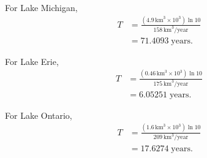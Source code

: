 \begin{ex}
\begin{enumerate}
\begin{sol}
          For Lake Michigan,
          \begin{align*}
            T&=\frac{\left(4.9\, \text{km}^3 \times 10^3\right) \ln{10}}{158\, \text{km}^3/\text{year}} \\
            &=71.4093\; \text{years}.
          \end{align*}

          For Lake Erie,
          \begin{align*}
            T&=\frac{\left(0.46 \, \text{km}^3 \times 10^3\right) \ln{10}}{175\, \text{km}^3/\text{year}} \\
            &=6.05251\; \text{years}.
          \end{align*}

          For Lake Ontario,
          \begin{align*}
            T&=\frac{\left(1.6\, \text{km}^3 \times 10^3\right) \ln{10}}{209\, \text{km}^3/\text{year}} \\
            &=17.6274\; \text{years}.
          \end{align*}
        \end{sol}
    \end{enumerate}
\end{ex}

